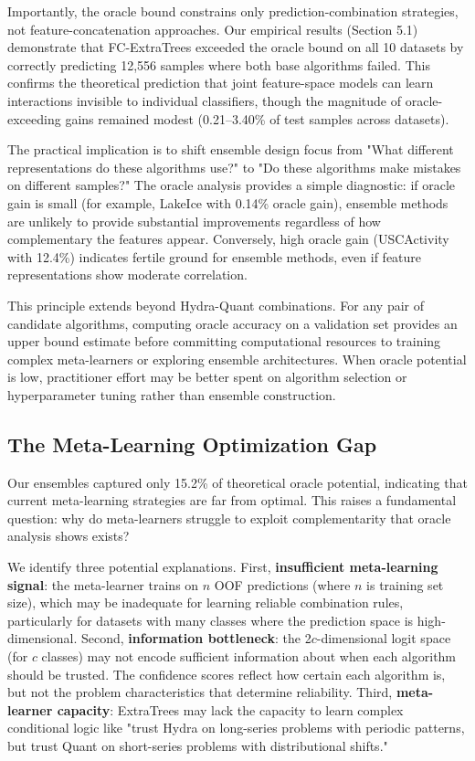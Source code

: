 \documentclass[pdflatex,sn-basic]{sn-jnl}           %
\theoremstyle{thmstyleone}%
\theoremstyle{thmstyletwo}%
\theoremstyle{thmstylethree}%
\begin{document}
Importantly, the oracle bound constrains only prediction-combination strategies, not feature-concatenation approaches. Our empirical results (Section 5.1) demonstrate that FC-ExtraTrees exceeded the oracle bound on all 10 datasets by correctly predicting 12,556 samples where both base algorithms failed. This confirms the theoretical prediction that joint feature-space models can learn interactions invisible to individual classifiers, though the magnitude of oracle-exceeding gains remained modest (0.21--3.40\% of test samples across datasets).

The practical implication is to shift ensemble design focus from "What different representations do these algorithms use?" to "Do these algorithms make mistakes on different samples?" The oracle analysis provides a simple diagnostic: if oracle gain is small (for example, LakeIce with 0.14\% oracle gain), ensemble methods are unlikely to provide substantial improvements regardless of how complementary the features appear. Conversely, high oracle gain (USCActivity with 12.4\%) indicates fertile ground for ensemble methods, even if feature representations show moderate correlation.

This principle extends beyond Hydra-Quant combinations. For any pair of candidate algorithms, computing oracle accuracy on a validation set provides an upper bound estimate before committing computational resources to training complex meta-learners or exploring ensemble architectures. When oracle potential is low, practitioner effort may be better spent on algorithm selection or hyperparameter tuning rather than ensemble construction.

\subsection{The Meta-Learning Optimization Gap}

Our ensembles captured only 15.2\% of theoretical oracle potential, indicating that current meta-learning strategies are far from optimal. This raises a fundamental question: why do meta-learners struggle to exploit complementarity that oracle analysis shows exists?

We identify three potential explanations. First, \textbf{insufficient meta-learning signal}: the meta-learner trains on $n$ OOF predictions (where $n$ is training set size), which may be inadequate for learning reliable combination rules, particularly for datasets with many classes where the prediction space is high-dimensional. Second, \textbf{information bottleneck}: the 2$c$-dimensional logit space (for $c$ classes) may not encode sufficient information about when each algorithm should be trusted. The confidence scores reflect how certain each algorithm is, but not the problem characteristics that determine reliability. Third, \textbf{meta-learner capacity}: ExtraTrees may lack the capacity to learn complex conditional logic like "trust Hydra on long-series problems with periodic patterns, but trust Quant on short-series problems with distributional shifts."
\end{document}
